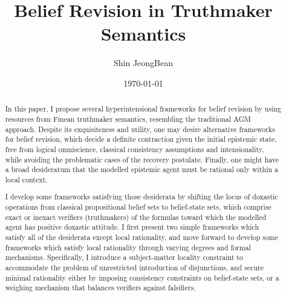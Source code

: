 \documentclass[12pt]{article}
\title{Belief Revision in Truthmaker Semantics}
\author{Shin JeongBean}
\date{\today}
\begin{document}
\setlength{\parskip}{8pt}
\setlength{\parindent}{1em} 
\maketitle
\begin{abstract}
In this paper, I propose several hyperintensional frameworks for belief revision by using resources from Finean truthmaker semantics, resembling the traditional AGM approach. Despite its exquisiteness and utility, one may desire alternative frameworks for belief revision, which decide a definite contraction given the initial epistemic state, free from logical omniscience, classical consistency assumptions and intensionality, while avoiding the problematic cases of the recovery postulate. Finally, one might have a broad desideratum that the modelled epistemic agent must be rational only within a local context. 
    \par
I develop some frameworks satisfying those desiderata by shifting the locus of doxastic operations from classical propositional belief sets to belief-state sets, which comprise exact or inexact verifiers (truthmakers) of the formulas toward which the modelled agent has positive doxastic attitude. I first present two simple frameworks which satisfy all of the desiderata except local rationality, and move forward to develop some frameworks which satisfy local rationality through varying degrees and formal mechanisms. Specifically, I introduce a subject-matter locality constraint to accommodate the problem of unrestricted introduction of disjunctions, and secure minimal rationality either by imposing consistency constraints on belief-state sets, or a weighing mechanism that balances verifiers against falsifiers.

\end{abstract}
\end{document}
